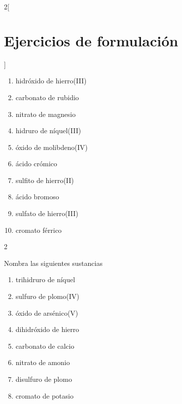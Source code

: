 \documentclass[10pt]{article}
\begin{document}
\begin{multicols*}{2}[
  \section{Ejercicios de formulación}
  ]
\begin{exercise}[
    tags    = {inorgánica,formulación,múltiple,2B},
    topics  = {química inorgánica,formulación,nomenclatura},
    source  = {Química 2B SAN 2016, p372, e18},
  ]
  \begin{enumerate}
    \item hidróxido de hierro(III)
    \item carbonato de rubidio
    \item nitrato de magnesio
    \item hidruro de níquel(III)
    \item óxido de molibdeno(IV)
    \item ácido crómico
    \item sulfito de hierro(II)
    \item ácido bromoso
    \item sulfato de hierro(III)
    \item cromato férrico
  \end{enumerate}
\end{exercise}

\begin{solution}
  \begin{enumerate}\begin{multicols}{2}
    \item {}
    \item {}
    \item {}
    \item {}
    \item {}
    \item {}
    \item {}
    \item {}
    \item {}
    \item {}
  \end{multicols}\end{enumerate}
\end{solution}




\begin{exercise}[
    tags    = {inorgánica,formulación,múltiple,2B},
    topics  = {química inorgánica,formulación,nomenclatura},
    source  = {Química 2B SAN 2016, p372, e19},
  ]
  Nombra las siguientes sustancias

  \begin{enumerate}
    \item trihidruro de níquel
    \item sulfuro de plomo(IV)
    \item óxido de arsénico(V)
    \item dihidróxido de hierro
    \item carbonato de calcio
    \item nitrato de amonio
    \item disulfuro de plomo
    \item cromato de potasio
  \end{enumerate}
\end{exercise}


\end{multicols*}
\end{document}
